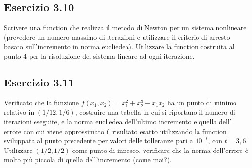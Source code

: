 \TODO


 
	\subsection{Esercizio 3.10}
Scrivere una function che realizza il metodo di Newton per un sistema nonlineare (prevedere un numero massimo di iterazioni e utilizzare il criterio di arresto basato sull’incremento in norma eucliedea). Utilizzare la function costruita al punto 4 per la risoluzione del sistema lineare ad ogni iterazione.

\TODO


 
	\subsection{Esercizio 3.11}
Verificato che la funzione $f(x_1,x_2) = x_1^2 + x_2^3 - x_1x_2$ ha un punto di minimo relativo in $(1/12, 1/6)$, costruire una tabella in cui si riportano il numero di iterazioni eseguite, e la norma eucliedea dell’ultimo incremento e quella dell’ errore con cui viene approssimato il risultato esatto utilizzando la function sviluppata al punto precedente per valori delle tolleranze pari a $10^{-t}$, con $t=3,6$. Utilizzare $(1/2, 1/2)$ come punto di innesco, verificare che la norma dell'errore è molto più piccola di quella dell'incremento (come mai?).

\TODO